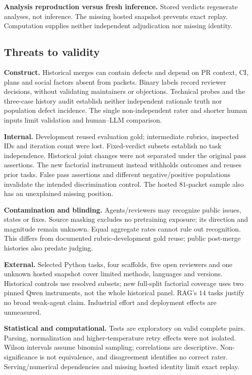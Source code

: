\documentclass[10pt,conference]{IEEEtran}
\begin{document}
\textbf{Analysis reproduction versus fresh inference.} Stored verdicts regenerate
analyses, not inference. The missing hosted snapshot prevents exact replay. Computation
supplies neither independent adjudication nor missing identity.

\subsection{Threats to validity}
\textbf{Construct.} Historical merges can contain defects and depend on PR
context, CI, plans and social factors absent from packets. Binary labels record
reviewer decisions, without validating maintainers or objections. Technical probes
and the three-case history audit establish neither independent rationale truth nor
population defect incidence. The single non-independent rater and shorter human
inputs limit validation and human--LLM comparison.

\textbf{Internal.} Development reused evaluation gold; intermediate rubrics,
inspected IDs and iteration count were lost. Fixed-verdict subsets establish no
task independence. Historical joint changes were not separated under the original pass assertions.
The new factorial instrument instead withholds outcomes and reuses prior tasks. False pass assertions
and different negative/positive populations invalidate the intended discrimination
control. The hosted $81$-packet sample also has an unexplained missing position.

\textbf{Contamination and blinding.} Agents/reviewers may recognize public issues,
states or fixes. Source masking excludes no pretraining exposure; its direction
and magnitude remain unknown. Equal aggregate rates cannot rule out recognition.
This differs from documented rubric-development gold reuse; public post-merge
histories also predate judging.

\textbf{External.} Selected Python tasks, four scaffolds, five open reviewers and
one unknown hosted snapshot cover limited methods, languages and versions.
Historical controls use resolved subsets; new full-split factorial coverage
uses two pinned Qwen instruments, not the whole historical panel. RAG's $14$ tasks justify no broad weak-agent claim. Industrial effort
and deployment effects are unmeasured.

\textbf{Statistical and computational.} Tests are exploratory on valid complete
pairs. Parsing, normalization and higher-temperature retry effects were not
isolated. Wilson intervals assume binomial sampling; correlations are descriptive.
Non-significance is not equivalence, and disagreement identifies no correct rater.
Serving/numerical dependencies and missing hosted identity limit exact replay.
\end{document}
